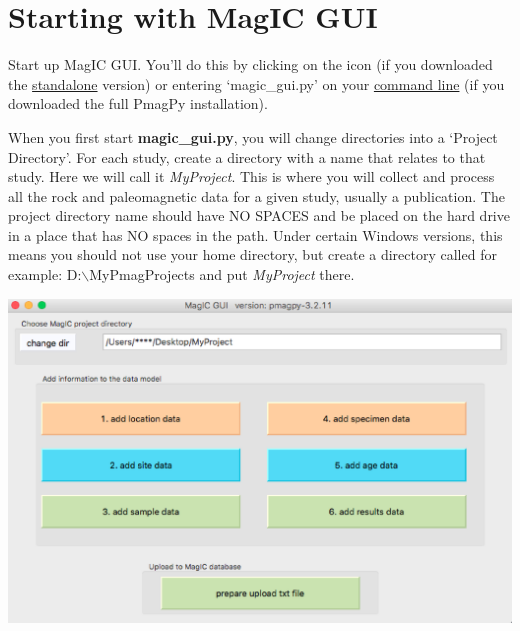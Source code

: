 \documentclass[11pt]{book}
\begin{document}
{\section{Starting with MagIC GUI}
Start up MagIC GUI.  You'll do this by clicking on the icon (if you downloaded the \href{#standalone}{standalone} version) or entering `magic\_gui.py' on your \href{#command_line}{command line} (if you downloaded the full PmagPy installation).

When you first start {\bf magic\_gui.py}, you will change directories into a  `Project Directory'. For each study, create a directory with a name that relates to that study. Here we will call it {\it MyProject}.  This is where you will collect  and process all the rock and paleomagnetic data for a given study, usually a publication.   The project directory name should have NO SPACES and be placed on the hard drive in a place that has NO spaces in the path. Under certain Windows versions, this means you should not use your home directory, but create a directory called for example: D:$\backslash$MyPmagProjects and put {\it MyProject} there.

  \includegraphics[width=25cm]{EPSfiles/MM_main_frame.eps}

}
\end{document}
